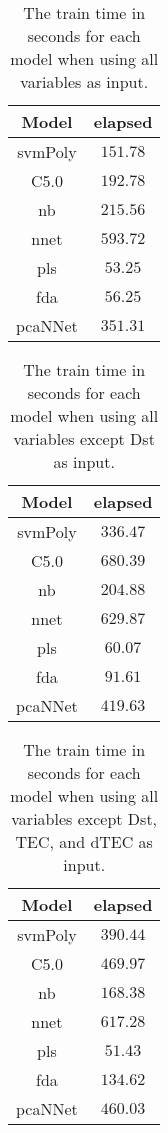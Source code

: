 \begin{table}[!ht]
	\centering
	\begin{tabular}{|c|c|}
		\hline
		Model & elapsed \\ \hline
		svmPoly & $151.78$ \\ \hline
		C5.0 & $192.78$ \\ \hline
		nb & $215.56$ \\ \hline
		nnet & $593.72$ \\ \hline
		pls & $53.25$ \\ \hline
		fda & $56.25$ \\ \hline
		pcaNNet & $351.31$ \\ \hline
	\end{tabular}
	\caption{The train time in seconds for each model when using all variables as input.}
	\label{tab:time:all:train}
\end{table}

\begin{table}[!ht]
	\centering
	\begin{tabular}{|c|c|}
		\hline
		Model & elapsed \\ \hline
		svmPoly & $336.47$ \\ \hline
		C5.0 & $680.39$ \\ \hline
		nb & $204.88$ \\ \hline
		nnet & $629.87$ \\ \hline
		pls & $60.07$ \\ \hline
		fda & $91.61$ \\ \hline
		pcaNNet & $419.63$ \\ \hline
	\end{tabular}
	\caption{The train time in seconds for each model when using all variables except Dst as input.}
	\label{tab:time:noDst:train}
\end{table}

\begin{table}[!ht]
	\centering
	\begin{tabular}{|c|c|}
		\hline
		Model & elapsed \\ \hline
		svmPoly & $390.44$ \\ \hline
		C5.0 & $469.97$ \\ \hline
		nb & $168.38$ \\ \hline
		nnet & $617.28$ \\ \hline
		pls & $51.43$ \\ \hline
		fda & $134.62$ \\ \hline
		pcaNNet & $460.03$ \\ \hline
	\end{tabular}
	\caption{The train time in seconds for each model when using all variables except Dst, TEC, and dTEC as input.}
	\label{tab:time:noTEC:train}
\end{table}

